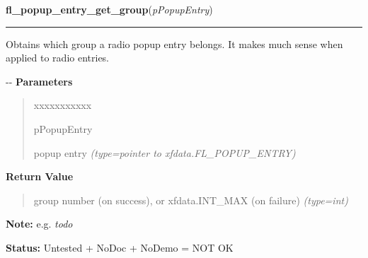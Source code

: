     \label{xformslib:flpopup:fl_popup_entry_get_group}

    \vspace{0.5ex}

\hspace{.8\funcindent}\begin{boxedminipage}{\funcwidth}

    \raggedright \textbf{fl\_popup\_entry\_get\_group}(\textit{pPopupEntry})

    \vspace{-1.5ex}

    \rule{\textwidth}{0.5\fboxrule}
\setlength{\parskip}{2ex}

Obtains which group a radio popup entry belongs. It makes much
sense when applied to radio entries.

-{}-
\setlength{\parskip}{1ex}
      \textbf{Parameters}
      \vspace{-1ex}

      \begin{quote}
        \begin{Ventry}{xxxxxxxxxxx}

          \item[pPopupEntry]


popup entry
            {\it (type=pointer to xfdata.FL\_POPUP\_ENTRY)}

        \end{Ventry}

      \end{quote}

      \textbf{Return Value}
    \vspace{-1ex}

      \begin{quote}

group number (on success), or xfdata.INT\_MAX (on failure)
      {\it (type=int)}

      \end{quote}

\textbf{Note:} 
e.g. \emph{todo}


\textbf{Status:} 
Untested + NoDoc + NoDemo = NOT OK


    \end{boxedminipage}

    \label{xformslib:flpopup:fl_popup_entry_set_group}

